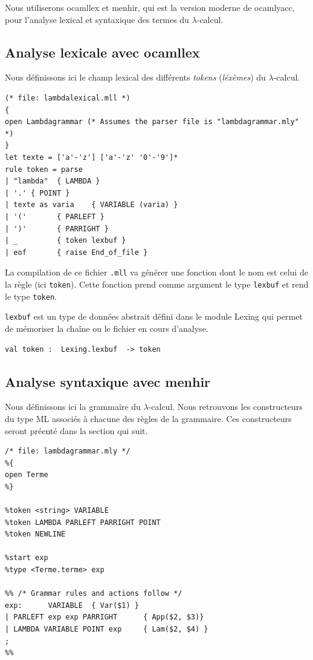 Nous utiliserons ocamllex et menhir, qui est la version moderne de ocamlyacc, pour l'analyse lexical et syntaxique des termes
du $\lambda $-calcul.

\subsection{Analyse lexicale avec ocamllex}
Nous d\'{e}finissons ici le champ lexical des diff\'{e}rents \textit{tokens}  (\textit{l\'{e}x\`{e}mes}) du
$\lambda$-calcul.


\begin{Verbatim}
(* file: lambdalexical.mll *)
{
open Lambdagrammar (* Assumes the parser file is "lambdagrammar.mly" *)
}
let texte = ['a'-'z'] ['a'-'z' '0'-'9']*
rule token = parse
| "lambda"	{ LAMBDA }
| '.' { POINT }
| texte as varia	{ VARIABLE (varia) }
| '('		{ PARLEFT }
| ')'		{ PARRIGHT }
| _			{ token lexbuf }
| eof		{ raise End_of_file }
\end{Verbatim}

La compilation de ce fichier \verb+.mll+ va générer une fonction dont le nom
est celui de la règle (ici \verb+token+).
Cette fonction prend comme argument le type \verb+lexbuf+ et rend le type \verb+token+. 

\verb+lexbuf+  est un type de données abstrait défini dans le module Lexing 
qui permet de mémoriser la chaîne ou le fichier en cours d'analyse.
\begin{Verbatim}
val token :  Lexing.lexbuf  -> token 
\end{Verbatim}

\subsection{Analyse syntaxique avec menhir}
Nous d\'{e}finissons ici la grammaire du $\lambda$-calcul.
Nous retrouvons les constructeurs du type ML associ\'{e}s \`{a} chacune des r\`{e}gles de la grammaire.
Ces constructeurs seront préenté dans la section qui suit.


\begin{Verbatim}
/* file: lambdagrammar.mly */
%{
open Terme
%}

%token <string> VARIABLE
%token LAMBDA PARLEFT PARRIGHT POINT
%token NEWLINE

%start exp
%type <Terme.terme> exp

%% /* Grammar rules and actions follow */
exp:      VARIABLE	{ Var($1) }
| PARLEFT exp exp PARRIGHT		{ App($2, $3)}
| LAMBDA VARIABLE POINT exp		{ Lam($2, $4) }
;
%%
\end{Verbatim}



